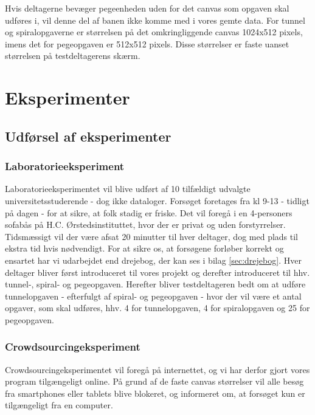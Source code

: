 Hvis deltagerne bevæger pegeenheden uden for det canvas som opgaven skal udføres i, vil denne del af banen ikke komme med i vores gemte data. For tunnel og spiralopgaverne er størrelsen på det omkringliggende canvas 1024x512 pixels, imens det for pegeopgaven er 512x512 pixels. Disse størrelser er faste uanset størrelsen på testdeltagerens skærm.

\chapter*{Eksperimenter}

\section*{Udførsel af eksperimenter}

\subsection*{Laboratorieeksperiment}
Laboratorieeksperimentet vil blive udført af 10 tilfældigt udvalgte universitetsstuderende - dog ikke dataloger.
Forsøget foretages fra kl 9-13 - tidligt på dagen - for at sikre, at folk stadig er friske. Det vil foregå i en 4-personers sofabås på H.C. Ørstedsinstituttet, hvor der er privat og uden forstyrrelser.
Tidsmæssigt vil der være afsat 20 minutter til hver deltager, dog med plads til ekstra tid hvis nødvendigt. For at sikre os, at forsøgene forløber korrekt og ensartet har vi udarbejdet end drejebog, der kan ses i bilag \ref{sec:drejebog}. Hver deltager bliver først introduceret til vores projekt og derefter introduceret til hhv. tunnel-, spiral- og pegeopgaven.
Herefter bliver testdeltageren bedt om at udføre tunnelopgaven - efterfulgt af spiral- og pegeopgaven - hvor der vil være et antal opgaver, som skal udføres, hhv. 4 for tunnelopgaven, 4 for spiralopgaven og 25 for pegeopgaven.

\subsection*{Crowdsourcingeksperiment}
Crowdsourcingeksperimentet vil foregå på internettet, og vi har derfor gjort vores program tilgængeligt online. På grund af de faste canvas størrelser vil alle besøg fra smartphones eller tablets blive blokeret, og informeret om, at forsøget kun er tilgængeligt fra en computer. 

